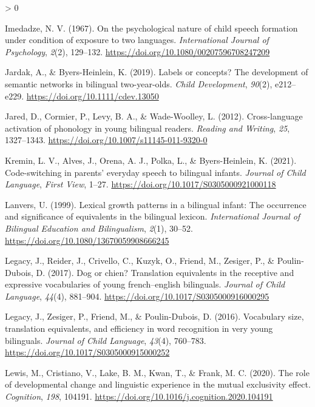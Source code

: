 \documentclass[
  english,
  ,man,floatsintext]{apa6}
\newlength{\cslhangindent}
\newenvironment{CSLReferences}[2] %
 {%
  \setlength{\parindent}{0pt}
  \ifodd #1 \everypar{\setlength{\hangindent}{\cslhangindent}}\ignorespaces\fi
  \ifnum #2 > 0
  \setlength{\parskip}{#2\baselineskip}
  \fi
 }%
 {}
\begin{document}
\begin{CSLReferences}{1}{0}
\leavevmode\hypertarget{ref-Imedadze_1967}{}%
Imedadze, N. V. (1967). On the psychological nature of child speech formation under condition of exposure to two languages. \emph{International Journal of Psychology}, \emph{2}(2), 129--132. \url{https://doi.org/10.1080/00207596708247209}

\leavevmode\hypertarget{ref-Jardak_Byers-Heinlein_2019}{}%
Jardak, A., \& Byers-Heinlein, K. (2019). Labels or concepts? The development of semantic networks in bilingual two-year-olds. \emph{Child Development}, \emph{90}(2), e212--e229. \url{https://doi.org/10.1111/cdev.13050}

\leavevmode\hypertarget{ref-Jared_etal_2012}{}%
Jared, D., Cormier, P., Levy, B. A., \& Wade-Woolley, L. (2012). Cross-language activation of phonology in young bilingual readers. \emph{Reading and Writing}, \emph{25}, 1327--1343. \url{https://doi.org/10.1007/s11145-011-9320-0}

\leavevmode\hypertarget{ref-Kremin_etal_2021}{}%
Kremin, L. V., Alves, J., Orena, A. J., Polka, L., \& Byers-Heinlein, K. (2021). Code-switching in parents' everyday speech to bilingual infants. \emph{Journal of Child Language}, \emph{First View}, 1--27. \url{https://doi.org/10.1017/S0305000921000118}

\leavevmode\hypertarget{ref-Lanvers_1999}{}%
Lanvers, U. (1999). Lexical growth patterns in a bilingual infant: The occurrence and significance of equivalents in the bilingual lexicon. \emph{International Journal of Bilingual Education and Bilingualism}, \emph{2}(1), 30--52. \url{https://doi.org/10.1080/13670059908666245}

\leavevmode\hypertarget{ref-Legacy_etal_2017}{}%
Legacy, J., Reider, J., Crivello, C., Kuzyk, O., Friend, M., Zesiger, P., \& Poulin-Dubois, D. (2017). Dog or chien? Translation equivalents in the receptive and expressive vocabularies of young french--english bilinguals. \emph{Journal of Child Language}, \emph{44}(4), 881--904. \url{https://doi.org/10.1017/S0305000916000295}

\leavevmode\hypertarget{ref-Legacy_etal_2016}{}%
Legacy, J., Zesiger, P., Friend, M., \& Poulin-Dubois, D. (2016). Vocabulary size, translation equivalents, and efficiency in word recognition in very young bilinguals. \emph{Journal of Child Language}, \emph{43}(4), 760--783. \url{https://doi.org/10.1017/S0305000915000252}

\leavevmode\hypertarget{ref-Lewis_etal_2020}{}%
Lewis, M., Cristiano, V., Lake, B. M., Kwan, T., \& Frank, M. C. (2020). The role of developmental change and linguistic experience in the mutual exclusivity effect. \emph{Cognition}, \emph{198}, 104191. \url{https://doi.org/10.1016/j.cognition.2020.104191}


\end{CSLReferences}
\end{document}

